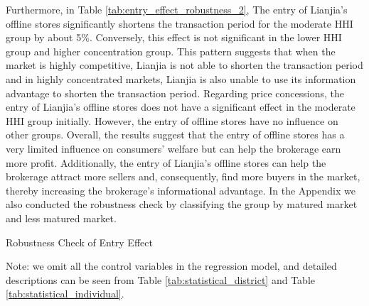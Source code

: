 \documentclass[11pt]{article}
\begin{document}
Furthermore, in Table \ref{tab:entry_effect_robustness_2}, The entry of Lianjia's offline stores significantly shortens the transaction period for the moderate HHI group by about 5\%. Conversely, this effect is not significant in the lower HHI group and higher concentration group. This pattern suggests that when the market is highly competitive, Lianjia is not able to shorten the transaction period and in highly concentrated markets, Lianjia is also unable to use its information advantage to shorten the transaction period. Regarding price concessions, the entry of Lianjia's offline stores does not have a significant effect in the moderate HHI group initially. However, the entry of offline stores have no influence on other groups. Overall, the results suggest that the entry of offline stores has a very limited influence on consumers' welfare but can help the brokerage earn more profit. Additionally, the entry of Lianjia's offline stores can help the brokerage attract more sellers and, consequently, find more buyers in the market, thereby increasing the brokerage's informational advantage. In the Appendix we also conducted the robustness check by classifying the group by matured market and less matured market.


\begin{table}
  \begin{center}
    \begin{scriptsize}
      \caption{Robustness Check of Entry Effect}
      \label{tab:entry_effect_robustness_1}
      
    
    Note: we omit all the control variables in the regression model, and detailed descriptions can be seen from Table \ref{tab:statistical_district} and Table \ref{tab:statistical_individual}.
    \end{scriptsize}
  \end{center}
\end{table}
\end{document}
